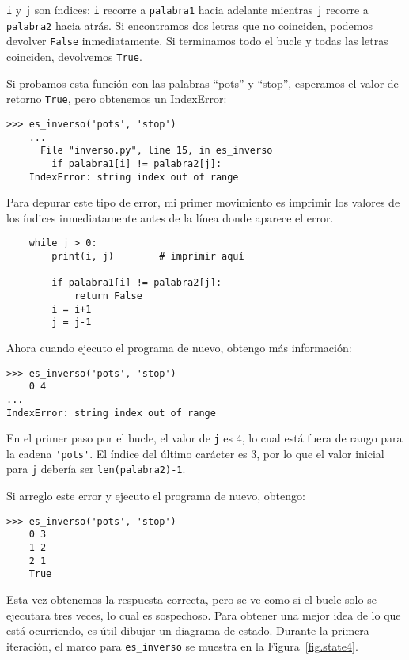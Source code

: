 \documentclass[10pt]{book}
\begin{document}
{\tt i} y {\tt j} son índices: {\tt i} recorre a {\tt palabra1}
hacia adelante mientras {\tt j} recorre a {\tt palabra2} hacia atrás.  Si encontramos
dos letras que no coinciden, podemos devolver {\tt False} inmediatamente.
Si terminamos todo el bucle y todas las letras coinciden,
devolvemos {\tt True}.

Si probamos esta función con las palabras ``pots'' y ``stop'',
esperamos el valor de retorno {\tt True}, pero obtenemos un IndexError:

\begin{verbatim}
>>> es_inverso('pots', 'stop')
    ...
      File "inverso.py", line 15, in es_inverso
        if palabra1[i] != palabra2[j]:
    IndexError: string index out of range
\end{verbatim}
%
Para depurar este tipo de error, mi primer movimiento es
imprimir los valores de los índices inmediatamente antes de la línea
donde aparece el error.

\begin{verbatim}
    while j > 0:
        print(i, j)        # imprimir aquí

        if palabra1[i] != palabra2[j]:
            return False
        i = i+1
        j = j-1
\end{verbatim}
%
Ahora cuando ejecuto el programa de nuevo, obtengo más información:

\begin{verbatim}
>>> es_inverso('pots', 'stop')
    0 4
...
IndexError: string index out of range
\end{verbatim}
%
En el primer paso por el bucle, el valor de {\tt j} es 4,
lo cual está fuera de rango para la cadena \verb"'pots'".
El índice del último carácter es 3, por lo que el
valor inicial para {\tt j} debería ser {\tt len(palabra2)-1}.

Si arreglo este error y ejecuto el programa de nuevo, obtengo:

\begin{verbatim}
>>> es_inverso('pots', 'stop')
    0 3
    1 2
    2 1
    True
\end{verbatim}
%
Esta vez obtenemos la respuesta correcta, pero se ve como si el bucle solo se ejecutara
tres veces, lo cual es sospechoso.  Para obtener una mejor idea de lo que está
ocurriendo, es útil dibujar un diagrama de estado.  Durante la primera
iteración, el marco para \verb"es_inverso" se muestra en la
Figura~\ref{fig.state4}.   
\end{document}
